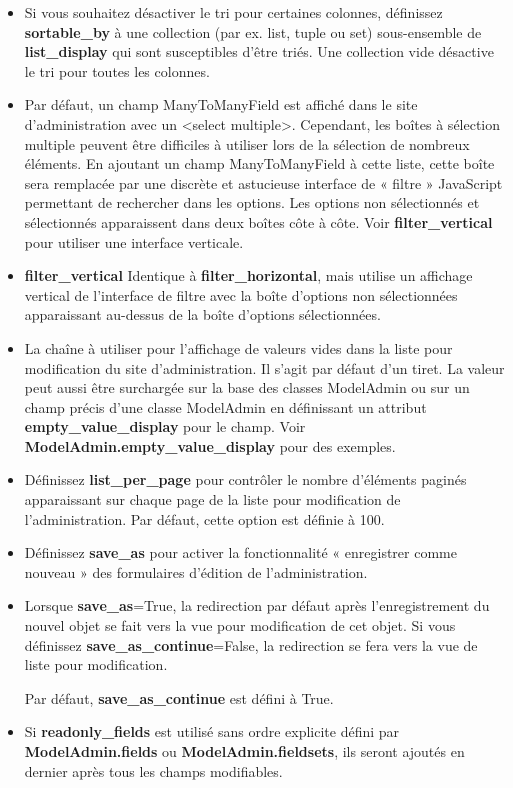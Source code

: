 \documentclass[11pt,a4paper]{article}
\begin{document}
\begin{enumerate}
\begin{itemize}
		\item Si vous souhaitez désactiver le tri pour certaines colonnes, définissez \textbf{sortable\_by} à une collection (par ex. list, tuple ou set) sous-ensemble de \textbf{list\_display} qui sont susceptibles d’être triés. Une collection vide désactive le tri pour toutes les colonnes.
		\item Par défaut, un champ ManyToManyField est affiché dans le site d’administration avec un <select multiple>. Cependant, les boîtes à sélection multiple peuvent être difficiles à utiliser lors de la sélection de nombreux éléments. En ajoutant un champ ManyToManyField à cette liste, cette boîte sera remplacée par une discrète et astucieuse interface de « filtre » JavaScript permettant de rechercher dans les options. Les options non sélectionnés et sélectionnés apparaissent dans deux boîtes côte à côte. Voir \textbf{filter\_vertical} pour utiliser une interface verticale.
		\item  \textbf{filter\_vertical}   Identique à \textbf{filter\_horizontal}, mais utilise un affichage vertical de l’interface de filtre avec la boîte d’options non sélectionnées apparaissant au-dessus de la boîte d’options sélectionnées.
		\item     La chaîne à utiliser pour l’affichage de valeurs vides dans la liste pour modification du site d’administration. Il s’agit par défaut d’un tiret. La valeur peut aussi être surchargée sur la base des classes ModelAdmin ou sur un champ précis d’une classe ModelAdmin en définissant un attribut \textbf{empty\_value\_display} pour le champ. Voir \textbf{ModelAdmin.empty\_value\_display} pour des exemples.
		\item     Définissez \textbf{list\_per\_page} pour contrôler le nombre d’éléments paginés apparaissant sur chaque page de la liste pour modification de l’administration. Par défaut, cette option est définie à 100.
		\item Définissez \textbf{save\_as} pour activer la fonctionnalité « enregistrer comme nouveau » des formulaires d’édition de l’administration.
		\item     Lorsque \textbf{save\_as}=True, la redirection par défaut après l’enregistrement du nouvel objet se fait vers la vue pour modification de cet objet. Si vous définissez \textbf{save\_as\_continue}=False, la redirection se fera vers la vue de liste pour modification.

    Par défaut, \textbf{save\_as\_continue} est défini à True.
		\item Si \textbf{readonly\_fields} est utilisé sans ordre explicite défini par \textbf{ModelAdmin.fields} ou \textbf{ModelAdmin.fieldsets}, ils seront ajoutés en dernier après tous les champs modifiables.


\end{itemize}
\end{enumerate}
\end{document}
